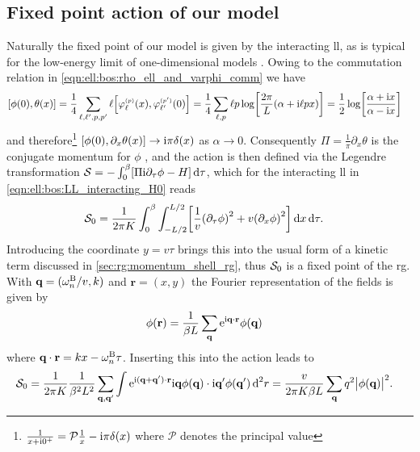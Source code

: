 \subsection{Fixed point action of our model}\label{sec:ell:rg:msrg_fixed_point}
Naturally the fixed point of our model is given by the interacting \gls{ll}, as is typical for the low-energy limit of one-dimensional models \cite[]{Giamarchi_2004}.
Owing to the commutation relation in \autoref{eqn:ell:bos:rho_ell_and_varphi_comm} we have
\begin{align*}
\klb*{\phi(0), \theta(x)} &= \frac{1}{4} \sum_{\ell,\ell',p,p'} \ell \klb*{\varphi_\ell\epsmall{p}(x), \varphi_{\ell'}\epsmall{p'}(0)} = \frac{1}{4} \sum_{\ell,p} \ell p \log\klb*{\frac{2\pi}{L}\kla*{\alpha + \i\ell px}} = \frac{1}{2} \log\klb*{\frac{\alpha +\i x}{\alpha - \i x}}
\end{align*}
and therefore\footnote{$\frac{1}{x+\i 0^+} = \mathcal{P}\frac{1}{x} - \i\pi\delta(x)$ where $\mathcal{P}$ denotes the principal value} $\klb*{\phi(0), \partial_x\theta(x)} \rightarrow \i\pi\delta(x)$ as $\alpha\rightarrow 0$.
Consequently $\Pi = \frac{1}{\pi}\partial_x\theta$ is the conjugate momentum for $\phi$ \cite[]{Giamarchi_2004}, and the action is then defined via the Legendre transformation $\sact = -\intx{0}{\beta}{\klb*{\Pi \i\partial_\tau\phi - H}}{\tau}$, which for the interacting \gls{ll} in \autoref{eqn:ell:bos:LL_interacting_H0} reads \cite[\sapp C]{Giamarchi_2004}
\begin{align*}
\sact_0 &= \frac{1}{2\pi K} \intx{0}{\beta}{ \intx{-L/2 }{L/2 }{\klb*{\frac{1}{v} \kla*{\partial_\tau \phi}^2 + v\kla*{\partial_x\phi}^2}}{x} }{\tau}.
\end{align*}
Introducing the coordinate $y=v\tau$ brings this into the usual form of a kinetic term discussed in \autoref{sec:rg:momentum_shell_rg}, thus $\sact_0$ is a fixed point of the \gls{rg}.
With $\textbf{q}=(\omega_n^\B/v, k)$ and $\textbf{r}=(x,y)$ the Fourier representation of the fields is given by
\begin{align*}
\phi(\textbf{r}) &= \frac{1}{\beta L} \sum_\textbf{q} \powe{\i \textbf{q}\cdot \textbf{r}} \phi(\textbf{q})
\end{align*}
where $\textbf{q}\cdot \textbf{r} = kx-\omega_n^\B\tau$.
Inserting this into the action leads to
\begin{align*}
\sact_0 &= \frac{1}{2\pi K} \frac{1}{\beta^2 L^2} \sum_{\textbf{q},\textbf{q}'} \int \powe{\i (\textbf{q}+\textbf{q}')\cdot \textbf{r} } \i \textbf{q} \phi(\textbf{q})\cdot \i \textbf{q}' \phi(\textbf{q}')\,\d^2r = \frac{v}{2\pi K\beta L} \sum_\textbf{q} q^2 \abs[\big]{\phi(\textbf{q})}^2.
\end{align*}
